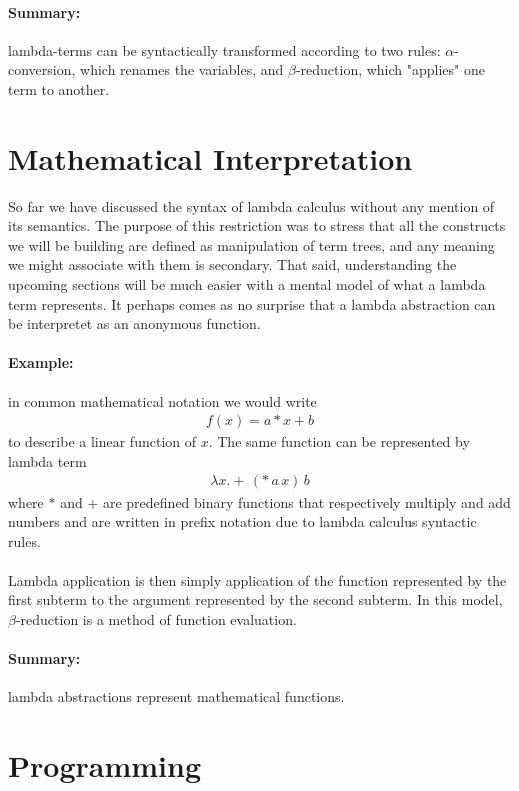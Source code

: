 \documentclass[11pt,twoside,a4paper]{article} %
\begin{document}
\paragraph{Summary:} lambda-terms can be syntactically transformed according to 
two rules: $\alpha$-conversion, which renames the variables, and $\beta$-reduction,
which "applies" one term to another.

\section{Mathematical Interpretation}

So far we have discussed the syntax of lambda calculus without any mention of
its semantics. The purpose of this restriction was to stress that all the
constructs we will be building are defined as manipulation of term trees,
and any meaning we might associate with them is secondary. That said,
understanding the upcoming sections will be much easier with a mental model of
what a lambda term represents. It perhaps comes as no surprise that a lambda
abstraction can be interpretet as an anonymous function. 

\paragraph{Example:} in common mathematical notation we would write 
\begin{align*}
f(x)=a*x+b
\end{align*}
to describe a linear function of $x$. The same function can be represented by 
lambda term 
\begin{align*}
\lambda x.+\,(*\,a\,x)\,b
\end{align*}
where $*$ and $+$ are predefined binary 
functions that respectively multiply and add numbers and are written in prefix
notation due to lambda calculus syntactic rules.
\\\\
Lambda application is then simply application of the function represented by
the first subterm to the argument represented by the second subterm. In this
model, $\beta$-reduction is a method of function evaluation.

\paragraph{Summary:} lambda abstractions represent mathematical functions.

\section{Programming}
\end{document}
